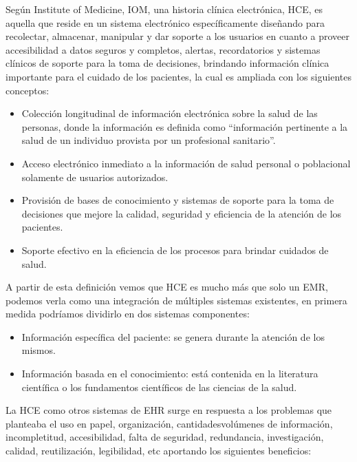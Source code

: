 Según Institute of Medicine, IOM, una historia clínica electrónica, HCE, es aquella que reside en un sistema electrónico específicamente diseñando para recolectar, almacenar, manipular y dar soporte a los usuarios en cuanto a proveer accesibilidad a datos seguros y completos, alertas, recordatorios y sistemas clínicos de soporte para la toma de decisiones, brindando información clínica importante para el cuidado de los pacientes, la cual es ampliada con los siguientes conceptos:
	\begin{itemize}
    \item Colección longitudinal de información electrónica sobre la salud de las personas, donde la información es definida como “información pertinente a la salud de un individuo provista por un profesional sanitario”.
    \item Acceso electrónico inmediato a la información de salud personal o poblacional solamente de usuarios autorizados.
    \item Provisión de bases de conocimiento y sistemas de soporte para la toma de decisiones que mejore la calidad, seguridad y eficiencia de la atención de los pacientes.
    \item Soporte efectivo en la eficiencia de los procesos para brindar cuidados de salud.
    \end{itemize}
   A partir de esta definición vemos que HCE es mucho más que solo un EMR, podemos verla como una integración de múltiples sistemas existentes, en primera medida podríamos dividirlo en dos sistemas componentes: 
	\begin{itemize}
    	\item Información específica del paciente: se genera durante la atención de los mismos.
        \item Información basada en el conocimiento: está contenida en la literatura científica o
los fundamentos científicos de las ciencias de la salud.
	\end{itemize}
    La HCE como otros sistemas de EHR surge en respuesta a los problemas que planteaba el uso en papel, organización, cantidades\/volúmenes de información, incompletitud, accesibilidad, falta de seguridad, redundancia, investigación, calidad, reutilización, legibilidad, etc aportando los siguientes beneficios:

